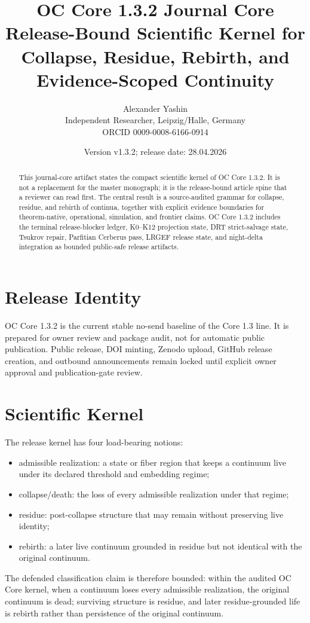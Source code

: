 \documentclass[11pt,a4paper]{article}
\title{\textbf{OC Core 1.3.2 Journal Core}\\
\large Release-Bound Scientific Kernel for Collapse, Residue, Rebirth, and Evidence-Scoped Continuity}
\author{Alexander Yashin\\Independent Researcher, Leipzig/Halle, Germany\\ORCID 0009-0008-6166-0914}
\date{Version v1.3.2; release date: 28.04.2026}
\begin{document}
\maketitle

\begin{abstract}
This journal-core artifact states the compact scientific kernel of OC Core 1.3.2. It is not a replacement for the master monograph; it is the release-bound article spine that a reviewer can read first. The central result is a source-audited grammar for collapse, residue, and rebirth of continua, together with explicit evidence boundaries for theorem-native, operational, simulation, and frontier claims. OC Core 1.3.2 includes the terminal release-blocker ledger, K0--K12 projection state, DRT strict-salvage state, Tsukrov repair, Parfitian Cerberus pass, LRGEF release state, and night-delta integration as bounded public-safe release artifacts.
\end{abstract}

\section*{Release Identity}
OC Core 1.3.2 is the current stable no-send baseline of the Core 1.3 line. It is prepared for owner review and package audit, not for automatic public publication. Public release, DOI minting, Zenodo upload, GitHub release creation, and outbound announcements remain locked until explicit owner approval and publication-gate review.

\section*{Scientific Kernel}
The release kernel has four load-bearing notions:
\begin{itemize}
  \item admissible realization: a state or fiber region that keeps a continuum live under its declared threshold and embedding regime;
  \item collapse/death: the loss of every admissible realization under that regime;
  \item residue: post-collapse structure that may remain without preserving live identity;
  \item rebirth: a later live continuum grounded in residue but not identical with the original continuum.
\end{itemize}
The defended classification claim is therefore bounded: within the audited OC Core kernel, when a continuum loses every admissible realization, the original continuum is dead; surviving structure is residue, and later residue-grounded life is rebirth rather than persistence of the original continuum.
\end{document}
